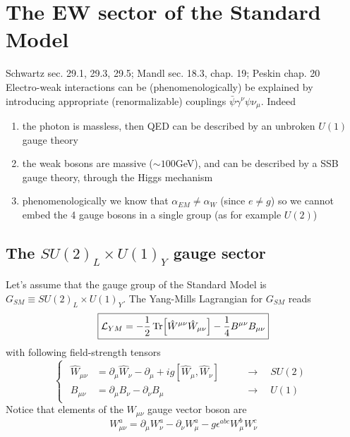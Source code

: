 \documentclass[TheoreticalPhy_ModB.tex]{subfiles}
\begin{document}
\newcommand{\lag}{\mathcal L}
\newcommand{\pde}[1]{\partial_{#1}}
\newcommand{\ipde}[1]{\partial^{#1}}
\newcommand{\mn}{{\mu\nu}}
\newcommand{\lr}{{L,R}}
\newcommand{\mcu}{\mathcal U}
\newcommand{\mcv}{\mathcal V}
\newcommand{\ckm}{V_{\text{CKM}}}
\newcommand{\pmns}{V_{\text{PMNS}}}

\chapter{The EW sector of the Standard Model}
\textsf{Schwartz sec. 29.1, 29.3, 29.5; Mandl sec. 18.3, chap. 19; Peskin chap. 20}\\

Electro-weak interactions can be (phenomenologically) be explained by introducing appropriate (renormalizable) couplings $\bar\psi\gamma^\nu\psi\nu_\mu$. Indeed
\begin{enumerate}[label=\textbullet]
\item the photon is massless, then QED can be described by an unbroken $U(1)$ gauge theory
\item the weak bosons are massive ($\sim100$GeV), and can be described by a SSB gauge theory, through the Higgs mechanism
\item phenomenologically we know that $\alpha_{EM}\neq\alpha_W$ (since $e\neq g$) so we cannot embed the 4 gauge bosons in a single group (as for example $U(2)$)
\end{enumerate}

\section{The $SU(2)_L\times U(1)_Y$ gauge sector}

Let's assume that the gauge group of the Standard Model is $\boxed{G_{SM}\equiv SU(2)_L\times U(1)_Y}$. The Yang-Mills Lagrangian for $G_{SM}$ reads
\[\boxed{\lag_{YM}=-\frac12\Tr[\hat W^{\mu\nu}\hat W_{\mu\nu}]-\frac14B^{\mu\nu}B_{\mu\nu}}\]
with following field-strength tensors
\[\begin{cases}\begin{aligned}
\hat W_{\mu\nu}&=\pde\mu\hat W_\nu-\pde\mu+ig\left[\hat W_\mu,\hat W_\nu\right]&&\quad\to\quad SU(2)\\
B_{\mu\nu}&=\pde\mu B_\nu-\pde\nu B_\mu&&\quad\to\quad U(1)
\end{aligned}\end{cases}\]
Notice that elements of the $W_{\mu\nu}$ gauge vector boson are
\[W_{\mu\nu}^a=\pde\mu W_\nu^a-\pde\nu W_\mu^a-g\epsilon^{abc}W_\mu^b W_\nu^c\]
\end{document}
